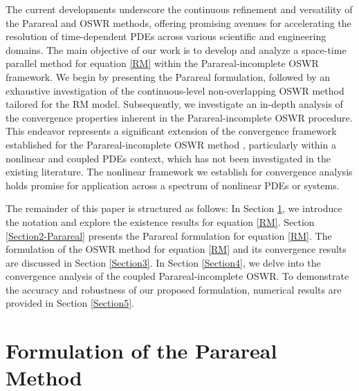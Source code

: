 \documentclass[11pt]{article}
\begin{document}
The current developments underscore the continuous refinement and versatility of the Parareal and OSWR methods, offering promising avenues for accelerating the resolution of time-dependent PDEs across various scientific and engineering domains.
The main objective of our work is to develop and analyze a space-time parallel method for equation \eqref{RM} within the Parareal-incomplete OSWR framework. We begin by presenting the Parareal formulation, followed by an exhaustive investigation of the continuous-level non-overlapping OSWR method tailored for the RM model. Subsequently, we investigate an in-depth analysis of the convergence properties inherent in the Parareal-incomplete OSWR procedure. This endeavor represents a significant extension of the convergence framework established for the Parareal-incomplete OSWR method \cite{bui2022coupling}, particularly within a nonlinear and coupled PDEs context, which has not been investigated in the existing literature. The nonlinear framework we establish for convergence analysis holds promise for application across a spectrum of nonlinear PDEs or systems.




The remainder of this paper is structured as follows: In Section \ref{Section2}, we introduce the notation and explore the existence results for equation \eqref{RM}. Section \ref{Section2-Parareal} presents the Parareal formulation for equation \eqref{RM}. The formulation of the OSWR method for equation \eqref{RM} and its convergence results are discussed in Section \ref{Section3}. In Section \ref{Section4}, we delve into the convergence analysis of the coupled Parareal-incomplete OSWR. To demonstrate the accuracy and robustness of our proposed formulation, numerical results are provided in Section \ref{Section5}.






\section{Formulation of the Parareal Method} \label{Section2}
\end{document}
